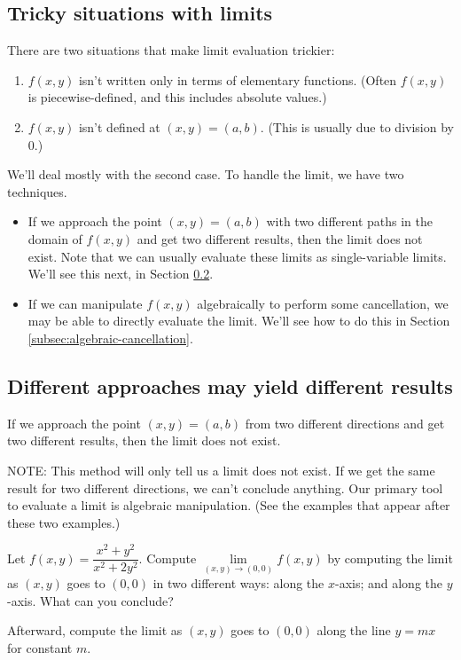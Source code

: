 \subsection{Tricky situations with limits}
There are two situations that make limit evaluation trickier:
\begin{enumerate}
    \item $f(x,y)$ isn't written only in terms of elementary functions. (Often $f(x,y)$ is piecewise-defined, and this includes absolute values.)
    \item $f(x,y)$ isn't defined at $(x,y)=(a,b)$. (This is usually due to division by 0.)
\end{enumerate}
We'll deal mostly with the second case. To handle the limit, we have two techniques.
\begin{itemize}
    \item If we approach the point $(x,y)=(a,b)$ with two different paths in the domain of $f(x,y)$ and get two different results, then the limit does not exist. Note that we can usually evaluate these limits as single-variable limits. We'll see this next, in Section \ref{subsec:different-approaches}.
    \item If we can manipulate $f(x,y)$ algebraically to perform some cancellation, we may be able to directly evaluate the limit. We'll see how to do this in Section \ref{subsec:algebraic-cancellation}.
\end{itemize}

\pagebreak 

\subsection{Different approaches may yield different results}\label{subsec:different-approaches}
If we approach the point $(x,y)=(a,b)$ from two different directions and get two different results, then the limit does not exist.

NOTE: This method will only tell us a limit does not exist. If we get the same result for two different directions, we can't conclude anything. Our primary tool to evaluate a limit is algebraic manipulation. (See the examples that appear after these two examples.)

\begin{ex}
    Let $f(x,y)=\dfrac{x^2+y^2}{x^2+2y^2}$. Compute $\lim\limits_{(x,y)\to(0,0)}f(x,y)$ by computing the limit as $(x,y)$ goes to $(0,0)$ in two different ways: along the $x$-axis; and along the $y$-axis. What can you conclude?
    
    Afterward, compute the limit as $(x,y)$ goes to $(0,0)$ along the line $y=mx$ for constant $m$.
\end{ex}

